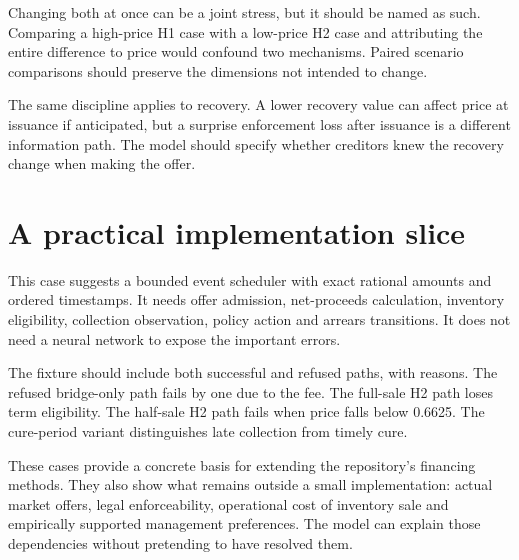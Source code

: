 Changing both at once can be a joint stress, but it should be named as such. Comparing a high-price H1 case with a low-price H2 case and attributing the entire difference to price would confound two mechanisms. Paired scenario comparisons should preserve the dimensions not intended to change.

The same discipline applies to recovery. A lower recovery value can affect price at issuance if anticipated, but a surprise enforcement loss after issuance is a different information path. The model should specify whether creditors knew the recovery change when making the offer.

\section{A practical implementation slice}
This case suggests a bounded event scheduler with exact rational amounts and ordered timestamps. It needs offer admission, net-proceeds calculation, inventory eligibility, collection observation, policy action and arrears transitions. It does not need a neural network to expose the important errors.

The fixture should include both successful and refused paths, with reasons. The refused bridge-only path fails by one due to the fee. The full-sale H2 path loses term eligibility. The half-sale H2 path fails when price falls below 0.6625. The cure-period variant distinguishes late collection from timely cure.

These cases provide a concrete basis for extending the repository's financing methods. They also show what remains outside a small implementation: actual market offers, legal enforceability, operational cost of inventory sale and empirically supported management preferences. The model can explain those dependencies without pretending to have resolved them.


